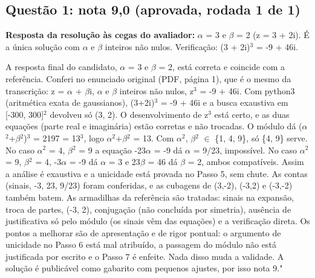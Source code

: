 \documentclass{article}%
\begin{document}
\subsection*{Questão 1: nota 9,0 (aprovada, rodada 1 de 1)}%
\textbf{Resposta da resolução às cegas do avaliador:} $\alpha$ = 3 e $\beta$ = 2 (z = 3 + 2i). É a única solução com $\alpha$ e $\beta$ inteiros não nulos. Verificação: (3 + 2i)$^3$ = -9 + 46i.\par %
A resposta final do candidato, $\alpha$ = 3 e $\beta$ = 2, está correta e coincide com a referência. Conferi no enunciado original (PDF, página 1), que é o mesmo da transcrição: z = $\alpha$ + $\beta$i, $\alpha$ e $\beta$ inteiros não nulos, z$^3$ = -9 + 46i. Com python3 (aritmética exata de gaussianos), (3+2i)$^3$ = -9 + 46i e a busca exaustiva em {[}-300, 300{]}$^2$ devolveu só (3, 2). O desenvolvimento de z$^3$ está certo, e as duas equações (parte real e imaginária) estão corretas e não trocadas. O módulo dá ($\alpha$$^2$+$\beta$$^2$)$^3$ = 2197 = 13$^3$, logo $\alpha$$^2$+$\beta$$^2$ = 13. Com $\alpha$$^2$, $\beta$$^2$ $\in$ \{1, 4, 9\}, só \{4, 9\} serve. No caso $\alpha$$^2$ = 4, $\beta$$^2$ = 9 a equação -23$\alpha$ = -9 dá $\alpha$ = 9/23, impossível. No caso $\alpha$$^2$ = 9, $\beta$$^2$ = 4, -3$\alpha$ = -9 dá $\alpha$ = 3 e 23$\beta$ = 46 dá $\beta$ = 2, ambos compatíveis. Assim a análise é exaustiva e a unicidade está provada no Passo 5, sem chute. As contas (sinais, -3, 23, 9/23) foram conferidas, e as cubagens de (3,-2), (-3,2) e (-3,-2) também batem. As armadilhas da referência são tratadas: sinais na expansão, troca de partes, (-3, 2), conjugação (não concluída por simetria), ausência de justificativa só pelo módulo (os sinais vêm das equações) e a verificação direta. Os pontos a melhorar são de apresentação e de rigor pontual: o argumento de unicidade no Passo 6 está mal atribuído, a passagem do módulo não está justificada por escrito e o Passo 7 é enfeite. Nada disso muda a validade. A solução é publicável como gabarito com pequenos ajustes, por isso nota 9."%
\end{document}
